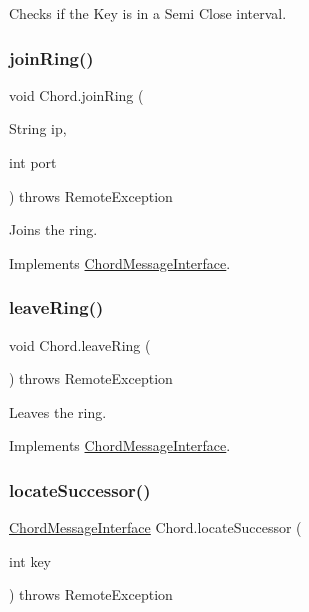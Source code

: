 Checks if the Key is in a Semi Close interval. 

\hypertarget{class_chord_ace0b8d2768590d7527af155c6573cae7}{}\label{class_chord_ace0b8d2768590d7527af155c6573cae7} 
\subsubsection{\texorpdfstring{join\+Ring()}{joinRing()}}
{\footnotesize\ttfamily void Chord.\+join\+Ring (\begin{DoxyParamCaption}\item[{String}]{ip,  }\item[{int}]{port }\end{DoxyParamCaption}) throws Remote\+Exception}



Joins the ring. 



Implements \hyperlink{interface_chord_message_interface_abc5a9483416a6b8ae7330b324869e236}{Chord\+Message\+Interface}.

\hypertarget{class_chord_aa1906d1d721280b3a10a7754f604990a}{}\label{class_chord_aa1906d1d721280b3a10a7754f604990a} 
\subsubsection{\texorpdfstring{leave\+Ring()}{leaveRing()}}
{\footnotesize\ttfamily void Chord.\+leave\+Ring (\begin{DoxyParamCaption}{ }\end{DoxyParamCaption}) throws Remote\+Exception}



Leaves the ring. 



Implements \hyperlink{interface_chord_message_interface_a6afa0f7ae38d68a936a85216fe33d5ae}{Chord\+Message\+Interface}.

\hypertarget{class_chord_aa53f4f7c97122395a33d064460538db0}{}\label{class_chord_aa53f4f7c97122395a33d064460538db0} 
\subsubsection{\texorpdfstring{locate\+Successor()}{locateSuccessor()}}
{\footnotesize\ttfamily \hyperlink{interface_chord_message_interface}{Chord\+Message\+Interface} Chord.\+locate\+Successor (\begin{DoxyParamCaption}\item[{int}]{key }\end{DoxyParamCaption}) throws Remote\+Exception}



